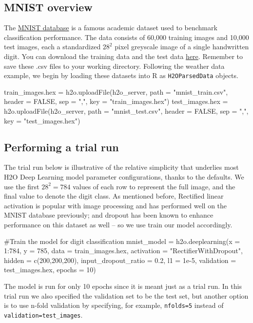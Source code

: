 \documentclass[11pt]{article}
\begin{document}
\subsection{MNIST overview} \label{3.1}

The \href{http://yann.lecun.com/exdb/mnist/}{MNIST database} is a famous academic dataset used to benchmark classification performance. The data consists of 60,000 training images and 10,000 test images, each a standardized $28^2$ pixel greyscale image of a single handwritten digit. You can download the training data and the test data \href{https://github.com/0xdata/h2o/tree/master/smalldata/mnist}{here}. Remember to save these .csv files to your working directory. Following the weather data example, we begin by loading these datasets into R as \texttt{H2OParsedData} objects. 

\begin{spverbatim}
train_images.hex = h2o.uploadFile(h2o_server, path = "mnist_train.csv", header = FALSE, sep = ",", key = "train_images.hex")
test_images.hex = h2o.uploadFile(h2o_server, path = "mnist_test.csv", header = FALSE, sep = ",", key = "test_images.hex")
\end{spverbatim}


\subsection{Performing a trial run} \label{3.2}
The trial run below is illustrative of the relative simplicity that underlies most H2O Deep Learning model parameter configurations, thanks to the defaults. We use the first $28^2 = 784$ values of each row to represent the full image, and the final value to denote the digit class. As mentioned before, Rectified linear activation is popular with image processing and has performed well on the MNIST database previously; and dropout has been known to enhance performance on this dataset as well -- so we use train our model accordingly. 
\begin{spverbatim}

#Train the model for digit classification
mnist_model = h2o.deeplearning(x = 1:784, y = 785, data = train_images.hex, activation = "RectifierWithDropout", hidden = c(200,200,200), input_dropout_ratio = 0.2, l1 = 1e-5, validation = test_images.hex, epochs = 10)

\end{spverbatim}
\noindent
The model is run for only 10 epochs since it is meant just as a trial run. In this trial run we also specified the validation set to be the test set, but another option is to use n-fold validation by specifying, for example, \texttt{nfolds=5} instead of \texttt{validation=test\_images}. 
\end{document}
